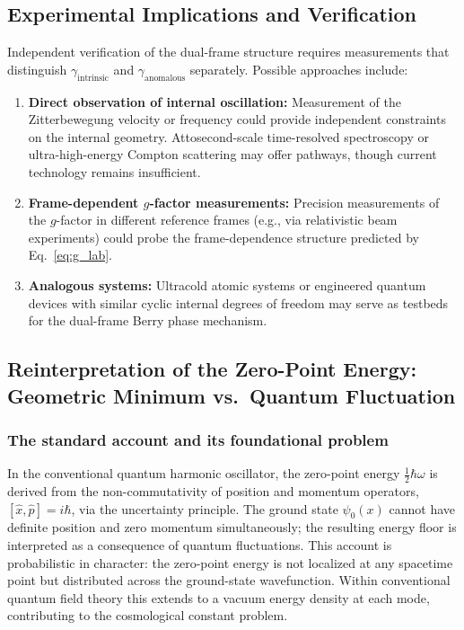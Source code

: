 \documentclass[%
 reprint,
 amsmath,amssymb,
 aps,
 prb,
]{revtex4-2}
\numberwithin{equation}{section}
\theoremstyle{definition}
\theoremstyle{remark}
\begin{document}
\subsection{Experimental Implications and Verification}

Independent verification of the dual-frame structure requires measurements that distinguish $\gamma_{\text{intrinsic}}$ and $\gamma_{\text{anomalous}}$ separately. Possible approaches include:

\begin{enumerate}
\item \textbf{Direct observation of internal oscillation:} Measurement of the Zitterbewegung velocity or frequency could provide independent constraints on the internal geometry. Attosecond-scale time-resolved spectroscopy or ultra-high-energy Compton scattering may offer pathways, though current technology remains insufficient.

\item \textbf{Frame-dependent $g$-factor measurements:} Precision measurements of the $g$-factor in different reference frames (e.g., via relativistic beam experiments) could probe the frame-dependence structure predicted by Eq.~\eqref{eq:g_lab}.

\item \textbf{Analogous systems:} Ultracold atomic systems or engineered quantum devices with similar cyclic internal degrees of freedom may serve as testbeds for the dual-frame Berry phase mechanism.
\end{enumerate}

\subsection{Reinterpretation of the Zero-Point Energy: Geometric Minimum vs.\ Quantum Fluctuation}
\label{sec:zpe_reinterpretation}

\subsubsection{The standard account and its foundational problem}

In the conventional quantum harmonic oscillator, the zero-point energy $\frac{1}{2}\hbar\omega$ is derived from the non-commutativity of position and momentum operators, $[\hat{x},\hat{p}] = i\hbar$, via the uncertainty principle. The ground state $\psi_0(x)$ cannot have definite position and zero momentum simultaneously; the resulting energy floor is interpreted as a consequence of quantum fluctuations. This account is probabilistic in character: the zero-point energy is not localized at any spacetime point but distributed across the ground-state wavefunction. Within conventional quantum field theory this extends to a vacuum energy density at each mode, contributing to the cosmological constant problem.
\end{document}
